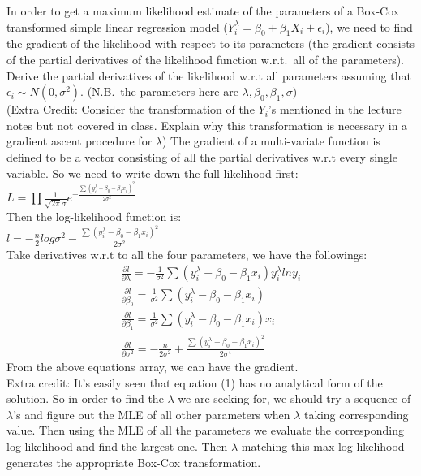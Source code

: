 \documentclass[12pt]{article}
\begin{document}
 { In order to get a maximum likelihood estimate of the
parameters of a Box-Cox transformed simple linear regression model
($Y_i^\lambda=\beta_0+\beta_1X_i+\epsilon_i$), we need to find the
gradient of the likelihood with respect to its parameters (the
gradient consists of the partial derivatives of the likelihood
function w.r.t.~all of the parameters). Derive the partial
derivatives of the likelihood w.r.t all parameters assuming that
$\epsilon_i\sim N(0,\sigma^2)$. (N.B.~the parameters here are
$\lambda,\beta_0,\beta_1,\sigma$)\\
(Extra Credit: Consider the transformation of the $Y_i$'s mentioned in the lecture notes but not covered in class.  Explain why this transformation is necessary in a gradient ascent procedure for $\lambda$)
 }
 { \vfill
  \answer
} { The gradient of a multi-variate function is defined to be a
vector consisting of all the partial derivatives w.r.t every single
variable. So we need to write down the full likelihood first:\\
$L=\prod\frac{1}{\sqrt{2\pi}\sigma}e^{-\frac{\sum(y_i^\lambda-\beta_0-\beta_1 x_i)^2}{2\sigma^2}}$\\
Then the log-likelihood function is: \\
$l=-\frac{n}{2}log\sigma^2-\frac{\sum(y_i^\lambda-\beta_0-\beta_1 x_i)^2}{2\sigma^2}$\\
Take derivatives w.r.t to all the four parameters, we have the followings:\\
\begin{eqnarray}
\frac{\partial l}{\partial \lambda}=-\frac{1}{\sigma^2}\sum(y_i^\lambda-\beta_0-\beta_1 x_i)y_i^\lambda ln y_i\\
\frac{\partial l}{\partial \beta_0}=\frac{1}{\sigma^2}\sum(y_i^\lambda-\beta_0-\beta_1 x_i)\\
\frac{\partial l}{\partial \beta_1}=\frac{1}{\sigma^2}\sum(y_i^\lambda-\beta_0-\beta_1 x_i)x_i\\
\frac{\partial l}{\partial \sigma^2}=-\frac{n}{2\sigma^2}+\frac{\sum(y_i^\lambda-\beta_0-\beta_1 x_i)^2}{2\sigma^4}
\end{eqnarray}
From the above equations array, we can have the gradient.\\
Extra credit: It's easily seen that equation (1) has no analytical form of the solution. So in order to find the $\lambda$ we are seeking for, we should try a sequence
of $\lambda$'s and figure out the MLE of all other parameters when $\lambda$ taking corresponding value. Then using the MLE of all the parameters we evaluate the corresponding
log-likelihood and find the largest one. Then $\lambda$ matching this max log-likelihood generates the appropriate Box-Cox transformation.}
\end{document}
